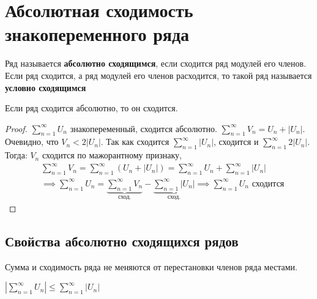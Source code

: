 \section{Абсолютная сходимость знакопеременного ряда}
\begin{opr}
    Ряд называется \textbf{абсолютно сходящимся}, если сходится ряд модулей его членов.
    Если ряд сходится, а ряд модулей его членов расходится, то такой ряд называется 
    \textbf{условно сходящимся}
\end{opr}

\begin{thm}
    Если ряд сходится абсолютно, то он сходится.\\
    \begin{proof}
        \(\sum_{n=1}^{\infty}U_{n}\) знакопеременный, сходится абсолютно.
        \(\sum_{n=1}^{\infty}V_{n} = U_{n} + |U_{n}|\).
        Очевидно, что \(V_{n} < 2|U_{n}|\). 
        Так как сходится \(\sum_{n=1}^{\infty} |U_{n}|\), 
        сходится и \(\sum_{n=1}^{\infty} 2|U_{n}|\).
        Тогда: \(V_{n}\) сходится по мажорантному признаку,
        \begin{equation}
            \begin{align*}
                &\sum_{n=1}^{\infty}V_{n} = \sum_{n=1}^{\infty}(U_{n} + |U_{n}|) 
                = \sum_{n=1}^{\infty}U_{n} + \sum_{n=1}^{\infty}|U_{n}|\\
                &\implies \sum_{n=1}^{\infty}U_{n} 
                = \underbrace{\sum_{n=1}^{\infty}V_{n}}_{\text{сход.}} 
                - \underbrace{\sum_{n=1}^{\infty}|U_{n}|}_{\text{сход.}} 
                \implies \sum_{n=1}^{\infty}U_{n} \text{ сходится}
            \end{align*}
        \end{equation}
    \end{proof}
\end{thm}

\subsection{Свойства абсолютно сходящихся рядов}
\begin{sv}
    Сумма и сходимость ряда не меняются 
    от перестановки членов ряда местами.
\end{sv}

\begin{sv}
    \(|\sum_{n=1}^{\infty}U_{n}| \leq \sum_{n=1}^{\infty}|U_{n}|\)
\end{sv}


